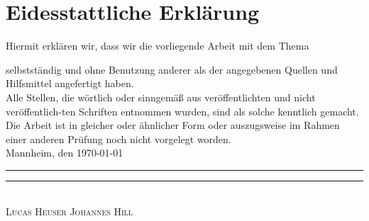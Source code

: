 \chapter*{Eidesstattliche Erklärung}

Hiermit erklären wir, dass wir die vorliegende Arbeit mit dem Thema
\begin{quote}
\textit{\titel}%
\end{quote}
selbstständig und ohne Benutzung anderer als der angegebenen Quellen und Hilfsmittel angefertigt haben. \\[2ex]
Alle Stellen, die wörtlich oder sinngemäß aus veröffentlichten und nicht veröffentlich-ten Schriften entnommen wurden, sind als solche kenntlich gemacht. \\[2ex]
Die Arbeit ist in gleicher oder ähnlicher Form oder auszugsweise im Rahmen einer anderen Prüfung noch nicht vorgelegt worden.
\\[10ex]


Mannheim, den \today \\[4ex]


\rule[-0.2cm]{5cm}{0.5pt} \hspace{4cm} \rule[-0.2cm]{5cm}{0.5pt} \\

\textsc{Lucas Heuser} \hspace{6,6cm} \textsc{Johannes Hill}

